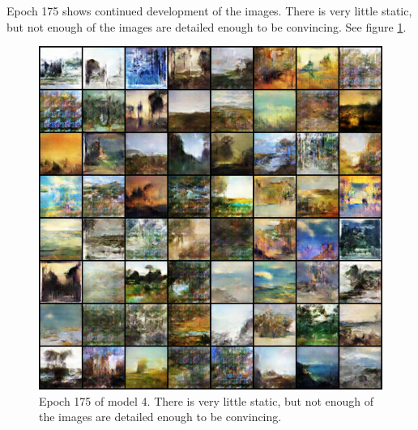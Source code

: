 \documentclass[11pt,letterpaper]{article}
\begin{document}
				Epoch 175 shows continued development of the images.
				There is very little static, but not enough of the images are detailed enough to be convincing.
				See figure \ref{fig:wa64:epoch175generator}.
				\begin{figure}
					\centering
					\includegraphics[width=1.0\linewidth]{results/model4/epoch175_generator}
					\caption{Epoch 175 of model 4. There is very little static, but not enough of the images are detailed enough to be convincing.}
					\label{fig:wa64:epoch175generator}
				\end{figure}
\end{document}

